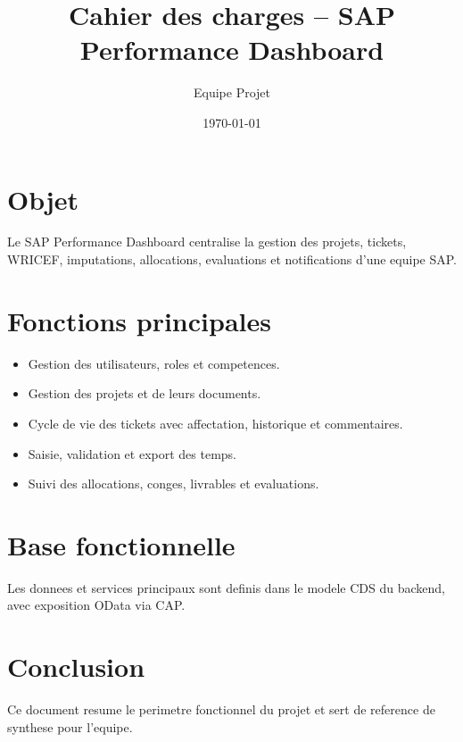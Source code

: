 \documentclass[12pt,a4paper]{article}
\title{Cahier des charges -- SAP Performance Dashboard}
\author{Equipe Projet}
\date{\today}
\begin{document}
\maketitle

\section*{Objet}
Le SAP Performance Dashboard centralise la gestion des projets, tickets, WRICEF, imputations, allocations, evaluations et notifications d'une equipe SAP.

\section*{Fonctions principales}
\begin{itemize}
  \item Gestion des utilisateurs, roles et competences.
  \item Gestion des projets et de leurs documents.
  \item Cycle de vie des tickets avec affectation, historique et commentaires.
  \item Saisie, validation et export des temps.
  \item Suivi des allocations, conges, livrables et evaluations.
\end{itemize}

\section*{Base fonctionnelle}
Les donnees et services principaux sont definis dans le modele CDS du backend, avec exposition OData via CAP.

\section*{Conclusion}
Ce document resume le perimetre fonctionnel du projet et sert de reference de synthese pour l'equipe.
\end{document}
